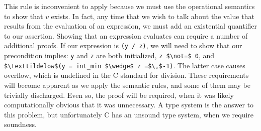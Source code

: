 \documentclass{puthesis}
\begin{document}
This rule is inconvenient to apply because we must use the operational
semantics to show that $v$ exists. In fact, any time that we wish to
talk about the value that results from the evaluation of an
expression, we must add an existential quantifier to our
assertion. Showing that an expression evaluates can require a number
of additional proofs. If our expression is \lstinline|(y / z)|, we
will need to show that our precondition implies: \lstinline|y| and
\lstinline|z| are both initialized, \lstinline|z $\not=$ 0|, and
\lstinline|$\texttildelow$(y = int_min $\wedge$ z =$\,$-1)|.  The
latter case causes overflow, which is undefined in the C standard for
division. These requirements will become apparent as we apply the
semantic rules, and some of them may be trivially discharged. Even
so, the proof will be required, when it was likely computationally
obvious that it was unnecessary. A type system is the answer to this
problem, but unfortunately C has an unsound type system, when we
require soundness.





\end{document}
